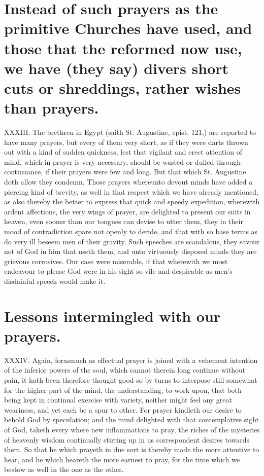 \section*{Instead of such prayers as the primitive Churches have used, and those that the reformed now use, we have (they say) divers short cuts or shreddings, rather wishes than prayers.}
XXXIII. The brethren in Egypt (saith St. Augustine, epist. 121,) are reported to have many prayers, but every of them very short, as if they were darts thrown out with a kind of sudden quickness, lest that vigilant and erect attention of mind, which in prayer is very necessary, should be wasted or dulled through continuance, if their prayers were few and long. But that which St. Augustine doth allow they  condemn. Those prayers whereunto devout minds have added a piercing kind of brevity, as well in that respect which we have already mentioned, as also thereby the better to express that quick and speedy expedition, wherewith ardent affections, the very wings of prayer, are delighted to present our suits in heaven, even sooner than our tongues can devise to utter them, they in their mood of contradiction spare not openly to deride, and that with so base terms as do very ill beseem men of their gravity. Such speeches are scandalous, they savour not of God in him that useth them, and unto virtuously disposed minds they are grievous corrosives.
 Our case were miserable, if that wherewith we most endeavour to please God were in his sight so vile and despicable as men’s disdainful speech would make it.


\section*{Lessons intermingled with our prayers.}
XXXIV. Again, forasmuch as effectual prayer is joined with a vehement intention of the inferior powers of the soul, which cannot therein long continue without pain, it hath been therefore thought good so by turns to interpose still somewhat for the higher part of the mind, the understanding, to work upon, that both being kept in continual exercise with variety, neither might feel any great weariness, and yet each be a spur to other. For prayer kindleth our desire to behold God by speculation; and the mind delighted with that contemplative sight of God, taketh every where new inflammations to pray, the riches of the mysteries of heavenly wisdom continually stirring up in us correspondent desires towards them. So that he which prayeth in due sort is thereby made the more attentive to hear, and he which heareth the more earnest to pray, for the time which we bestow as well in the one as the other.




